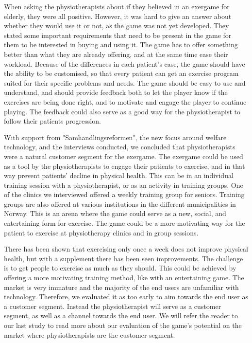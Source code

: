 When asking the physiotherapists about if they believed in an exergame for elderly, they were all positive. However, it was hard to give an answer about whether they would use it or not, as the game was not yet developed. They stated some important requirements that need to be present in the game for them to be interested in buying and using it. The game has to offer something better than what they are already offering, and at the same time ease their workload. Because of the differences in each patient's case, the game should have the ability to be customised, so that every patient can get an exercise program suited for their specific problems and needs. The game should be easy to use and understand, and should provide feedback both to let the player know if the exercises are being done right, and to motivate and engage the player to continue playing. The feedback could also serve as a good way for the physiotherapist to follow their patients progression.

With support from "Samhandlingsreformen", the new focus around welfare technology, and the interviews conducted, we concluded that physiotherapists were a natural customer segment for the exergame. The exergame could be used as a tool by the physiotherapists to engage their patients to exercise, and in that way prevent patients' decline in physical health. This can be in an individual training session with a physiotherapist, or as an activity in training groups. One of the clinics we interviewed offered a weekly training group for seniors. Training groups are also offered at various institutions in the different municipalities in Norway. This is an arena where the game could serve as a new, social, and entertaining form for exercise. The game could be a more motivating way for the patient to exercise at physiotherapy clinics and in group sessions. 

There has been shown that exercising only once a week does not improve physical health, but with a supplement there has been seen improvements. The challenge is to get people to exercise as much as they should. This could be achieved by offering a more motivating training method, like with an entertaining game. The market is very immature and the majority of the end users are unfamiliar with technology. Therefore, we evaluated it as too early to aim towards the end user as a customer segment. Instead the physiotherapist will serve as a customer segment, as well as a channel towards the end user. We will refer the reader to our last study \cite{project} to read more about our evaluation of the game's potential on the market where physiotherapists are the customer segment.

